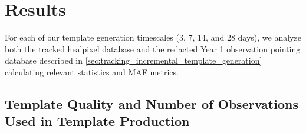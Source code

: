 \documentclass[preprint,linenumbers]{aastex631}
\begin{document}
{		
		
		
		
		
		\section{Results}
		\label{sec:results}
		
		
		For each of our template generation timescales (3, 7, 14, and 28 days), we analyze both the tracked healpixel database and the redacted Year 1 observation pointing database described in \ref{sec:tracking_incremental_template_generation} calculating relevant statistics and MAF metrics.  
		
		\subsection{Template Quality and Number of Observations Used in Template Production}
		
}
\end{document}
